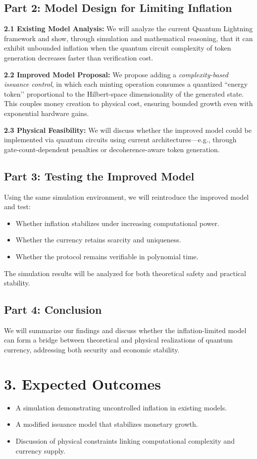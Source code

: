 \documentclass[a4paper,10.5pt,twoside]{article}
\begin{document}
\subsection*{Part 2: Model Design for Limiting Inflation}
\textbf{2.1 Existing Model Analysis:} We will analyze the current Quantum Lightning framework and show, through simulation and mathematical reasoning, that it can exhibit unbounded inflation when the quantum circuit complexity of token generation decreases faster than verification cost.  

\textbf{2.2 Improved Model Proposal:} We propose adding a \textit{complexity-based issuance control}, in which each minting operation consumes a quantized ``energy token’’ proportional to the Hilbert-space dimensionality of the generated state. This couples money creation to physical cost, ensuring bounded growth even with exponential hardware gains.

\textbf{2.3 Physical Feasibility:} We will discuss whether the improved model could be implemented via quantum circuits using current architectures—e.g., through gate-count-dependent penalties or decoherence-aware token generation.

\subsection*{Part 3: Testing the Improved Model}
Using the same simulation environment, we will reintroduce the improved model and test:
\begin{itemize}
    \item Whether inflation stabilizes under increasing computational power.
    \item Whether the currency retains scarcity and uniqueness.
    \item Whether the protocol remains verifiable in polynomial time.
\end{itemize}
The simulation results will be analyzed for both theoretical safety and practical stability.

\subsection*{Part 4: Conclusion}
We will summarize our findings and discuss whether the inflation-limited model can form a bridge between theoretical and physical realizations of quantum currency, addressing both security and economic stability.

\section*{3. Expected Outcomes}
\begin{itemize}
    \item A simulation demonstrating uncontrolled inflation in existing models.
    \item A modified issuance model that stabilizes monetary growth.
    \item Discussion of physical constraints linking computational complexity and currency supply.
\end{itemize}
\end{document}
